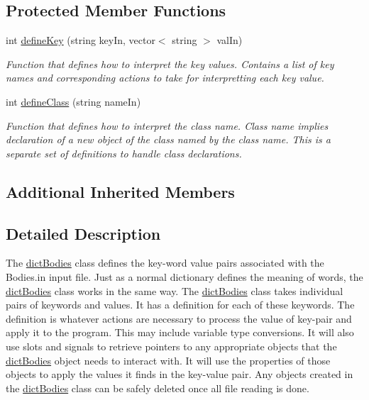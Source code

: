 \subsection*{Protected Member Functions}
\begin{DoxyCompactItemize}
\item 
int \hyperlink{classdict_bodies_a532b7006f9278ee79718670ea6bf7d06}{define\-Key} (string key\-In, vector$<$ string $>$ val\-In)
\begin{DoxyCompactList}\small\item\em Function that defines how to interpret the key values. Contains a list of key names and corresponding actions to take for interpretting each key value. \end{DoxyCompactList}\item 
int \hyperlink{classdict_bodies_aa3bd29546245bcbf593053e4ef163267}{define\-Class} (string name\-In)
\begin{DoxyCompactList}\small\item\em Function that defines how to interpret the class name. Class name implies declaration of a new object of the class named by the class name. This is a separate set of definitions to handle class declarations. \end{DoxyCompactList}\end{DoxyCompactItemize}
\subsection*{Additional Inherited Members}


\subsection{Detailed Description}
The \hyperlink{classdict_bodies}{dict\-Bodies} class defines the key-\/word value pairs associated with the Bodies.\-in input file. Just as a normal dictionary defines the meaning of words, the \hyperlink{classdict_bodies}{dict\-Bodies} class works in the same way. The \hyperlink{classdict_bodies}{dict\-Bodies} class takes individual pairs of keywords and values. It has a definition for each of these keywords. The definition is whatever actions are necessary to process the value of key-\/pair and apply it to the program. This may include variable type conversions. It will also use slots and signals to retrieve pointers to any appropriate objects that the \hyperlink{classdict_bodies}{dict\-Bodies} object needs to interact with. It will use the properties of those objects to apply the values it finds in the key-\/value pair. Any objects created in the \hyperlink{classdict_bodies}{dict\-Bodies} class can be safely deleted once all file reading is done.

